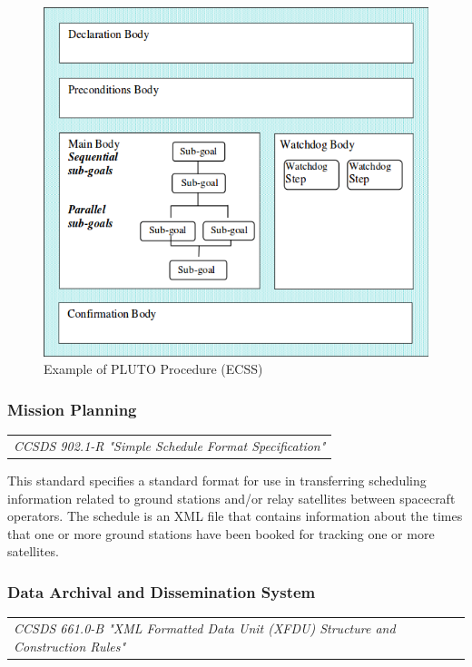  \begin{figure}[h]
\centering\includegraphics[scale=0.45]{fig/example_of_pluto_procedure}
\caption{Example of PLUTO Procedure (ECSS)}
\label{fig:Example of PLUTO Procedure}
\end{figure}

\subsubsection{Mission Planning}

\begin{tabular}{l}
\textit{CCSDS 902.1-R "Simple Schedule Format Specification" \cite{CCSDS 902.1-R}} \\
\end{tabular}

This standard specifies a standard format for use in transferring scheduling information related to ground stations and/or relay satellites between spacecraft operators. The schedule is an XML file that contains information about the times that one or more ground stations have been booked for tracking one or more satellites.

\subsubsection{Data Archival and Dissemination System}

\begin{tabular}{l}
\textit{CCSDS 661.0-B "XML Formatted Data Unit (XFDU) Structure and Construction Rules" \cite{CCSDS 661.0-B}} \\
\end{tabular}

